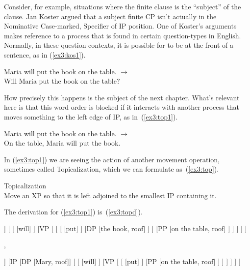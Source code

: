 Consider, for example, situations where the finite clause is the ``subject'' of the clause. Jan Koster\cite{Koster:1978} argued that a subject finite CP isn't actually in the Nominative Case-marked, Specifier of IP position. One of Koster's ar\-gu\-ments makes reference to a process that is found in certain question-types in English. Normally, in these question contexts, it is possible for  to be at the front of a sentence, as in (\ref{ex3:kos1}).
\begin{exe}
	\ex \label{ex3:kos1} Maria will put the book on the table. $\rightarrow$\\
						 Will Maria put the book on the table?
\end{exe}
How precisely this happens is the subject of the next chapter. What's relevant here is that this word order is blocked if it interacts with another process that moves something to the left edge of IP, as in~(\ref{ex3:top1}).
\begin{exe}
\ex \label{ex3:top1} Maria will put the book on the table. $\rightarrow$\\
					 On the table, Maria will put the book.
\end{exe}
In (\ref{ex3:top1}) we are seeing the action of another movement operation, sometimes called Topicalization, which we can formulate as~(\ref{ex3:top}).
\begin{exe}
	\raggedright
	\ex \label{ex3:top} Topicalization\\
	Move an XP so that it is left adjoined to the smallest IP containing it.
\end{exe}
The derivation for (\ref{ex3:top1}) is~(\ref{ex3:topd}).
\begin{fullwidth}
	\medskip
\begin{exe}
	\raggedright
	\ex \label{ex3:topd} 
	\small
	\begin{forest}
	[IP
		[DP [Maria, roof]]
		[ 
			[ [will] ]
			[VP [ 
				[ 
					[ [put] ]
					[DP [the book, roof] ]
				 ]
				[PP [on the table, roof] ]
			] ]
		]
	]
	\end{forest}
	{\Huge ,}
	\small
	\begin{forest}
	[IP
		[DP [the book, roof] ]
		[IP
			[DP [Mary, roof]]
			[ 
				[ [will] ]
				[VP [ 
					[ [put] ]
					[PP [on the table, roof] ]
				] ]
			 ]
		]
	]
	\end{forest}
\end{exe}
\medskip
\end{fullwidth}

